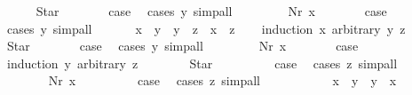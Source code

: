 \begin{isabellebody}
\ \ \ \ \isamarkupfalse%
\ Star\isanewline
\ \ \ \ \isamarkupfalse%
\ \isamarkupfalse%
\ {\isacharquery}case\ \isamarkupfalse%
\ {\isacharparenleft}cases\ y{\isacharparenright}\ simp{\isacharunderscore}all\isanewline
\ \ \isamarkupfalse%
\isanewline
\ \ \ \ \isamarkupfalse%
\ {\isacharparenleft}Nr\ x{\isacharparenright}\isanewline
\ \ \ \ \isamarkupfalse%
\ \isamarkupfalse%
\ {\isacharquery}case\ \isamarkupfalse%
\ {\isacharparenleft}cases\ y{\isacharparenright}\ simp{\isacharunderscore}all\isanewline
\ \ \isamarkupfalse%
\isanewline
\isanewline
\ \ \isamarkupfalse%
\ {\isachardoublequoteopen}x\ {\isasymle}\ y\ {\isasymLongrightarrow}\ y\ {\isasymle}\ z\ {\isasymLongrightarrow}\ x\ {\isasymle}\ z{\isachardoublequoteclose}\isanewline
\ \ \isamarkupfalse%
\ {\isacharparenleft}induction\ x\ arbitrary{\isacharcolon}\ y\ z{\isacharparenright}\isanewline
\ \ \ \ \isamarkupfalse%
\ Star\isanewline
\ \ \ \ \isamarkupfalse%
\ \isamarkupfalse%
\ {\isacharquery}case\ \isamarkupfalse%
\ {\isacharparenleft}cases\ y{\isacharparenright}\ simp{\isacharunderscore}all\isanewline
\ \ \isamarkupfalse%
\isanewline
\ \ \ \ \isamarkupfalse%
\ {\isacharparenleft}Nr\ x{\isacharparenright}\isanewline
\ \ \ \ \isamarkupfalse%
\ \isamarkupfalse%
\ {\isacharquery}case\isanewline
\ \ \ \ \isamarkupfalse%
\ {\isacharparenleft}induction\ y\ arbitrary{\isacharcolon}\ z{\isacharparenright}\isanewline
\ \ \ \ \ \ \isamarkupfalse%
\ Star\isanewline
\ \ \ \ \ \ \isamarkupfalse%
\ \isamarkupfalse%
\ {\isacharquery}case\ \isamarkupfalse%
\ {\isacharparenleft}cases\ z{\isacharparenright}\ simp{\isacharunderscore}all\isanewline
\ \ \ \ \isamarkupfalse%
\isanewline
\ \ \ \ \ \ \isamarkupfalse%
\ {\isacharparenleft}Nr\ x{\isacharparenright}\isanewline
\ \ \ \ \ \ \isamarkupfalse%
\ \isamarkupfalse%
\ {\isacharquery}case\ \isamarkupfalse%
\ {\isacharparenleft}cases\ z{\isacharparenright}\ simp{\isacharunderscore}all\isanewline
\ \ \ \ \isamarkupfalse%
\isanewline
\ \ \isamarkupfalse%
\isanewline
\isanewline
\ \ \isamarkupfalse%
\ {\isachardoublequoteopen}x\ {\isasymle}\ y\ {\isasymor}\ y\ {\isasymle}\ x{\isachardoublequoteclose}\isanewline

\end{isabellebody}
